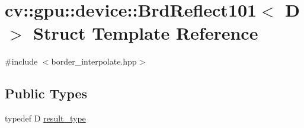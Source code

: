 \hypertarget{structcv_1_1gpu_1_1device_1_1BrdReflect101}{\section{cv\-:\-:gpu\-:\-:device\-:\-:Brd\-Reflect101$<$ D $>$ Struct Template Reference}
\label{structcv_1_1gpu_1_1device_1_1BrdReflect101}
}


{\ttfamily \#include $<$border\-\_\-interpolate.\-hpp$>$}

\subsection*{Public Types}
\begin{DoxyCompactItemize}
\item 
typedef D \hyperlink{structcv_1_1gpu_1_1device_1_1BrdReflect101_a243eb00a5855f0a100f67fd427e1b192}{result\-\_\-type}
\end{DoxyCompactItemize}
